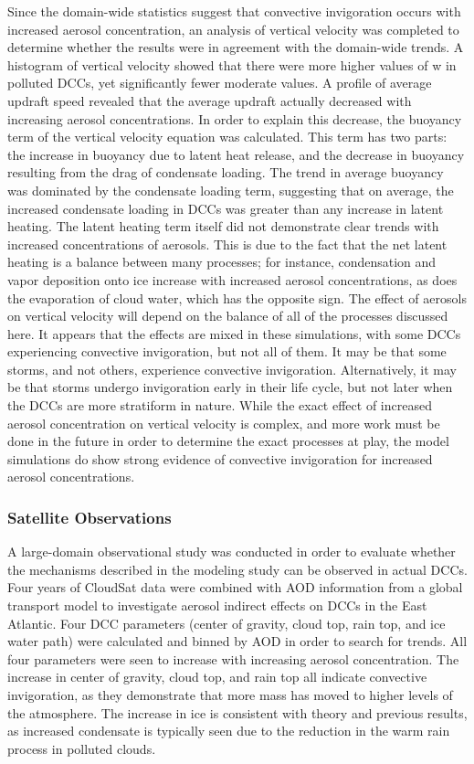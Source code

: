Since the domain-wide statistics suggest that convective invigoration occurs with increased aerosol concentration, an analysis of vertical velocity was completed to determine whether the results were in agreement with the domain-wide trends.  A histogram of vertical velocity showed that there were more higher values of w in polluted DCCs, yet significantly fewer moderate values.  A profile of average updraft speed revealed that the average updraft actually decreased with increasing aerosol concentrations.  In order to explain this decrease, the buoyancy term of the vertical velocity equation was calculated.  This term has two parts: the increase in buoyancy due to latent heat release, and the decrease in buoyancy resulting from the drag of condensate loading.  The trend in average buoyancy was dominated by the condensate loading term, suggesting that on average, the increased condensate loading in DCCs was greater than any increase in latent heating.  The latent heating term itself did not demonstrate clear trends with increased concentrations of aerosols.  This is due to the fact that the net latent heating is a balance between many processes; for instance, condensation and vapor deposition onto ice increase with increased aerosol concentrations, as does the evaporation of cloud water, which has the opposite sign.  The effect of aerosols on vertical velocity will depend on the balance of all of the processes discussed here.  It appears that the effects are mixed in these simulations, with some DCCs experiencing convective invigoration, but not all of them.  It may be that some storms, and not others, experience convective invigoration.  Alternatively, it may be that storms undergo invigoration early in their life cycle, but not later when the DCCs are more stratiform in nature.  While the exact effect of increased aerosol concentration on vertical velocity is complex, and more work must be done in the future in order to determine the exact processes at play, the model simulations do show strong evidence of convective invigoration for increased aerosol concentrations.  

\subsubsection{Satellite Observations}

A large-domain observational study was conducted in order to evaluate whether the mechanisms described in the modeling study can be observed in actual DCCs.  Four years of CloudSat data were combined with AOD information from a global transport model to investigate aerosol indirect effects on DCCs in the East Atlantic.  Four DCC parameters (center of gravity, cloud top, rain top, and ice water path) were calculated and binned by AOD in order to search for trends.  All four parameters were seen to increase with increasing aerosol concentration.  The increase in center of gravity, cloud top, and rain top all indicate convective invigoration, as they demonstrate that more mass has moved to higher levels of the atmosphere.  The increase in ice is consistent with theory and previous results, as increased condensate is typically seen due to the reduction in the warm rain process in polluted clouds.

